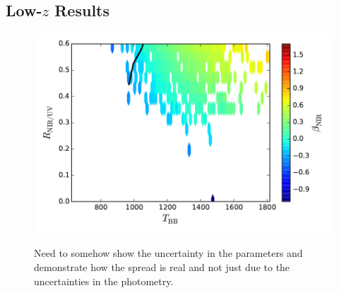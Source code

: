 \subsection{Low-$z$ Results}

\begin{figure}
  \centering
  \includegraphics[width=\columnwidth]{figures/chapter06/ratio_tbb_v3}
  \caption{}
  \label{fig:}
\end{figure}

\begin{figure}
  \centering
  \caption{Need to somehow show the uncertainty in the parameters and demonstrate how the spread is real and not just due to the uncertainties in the photometry.}
  \label{fig:}
\end{figure}


